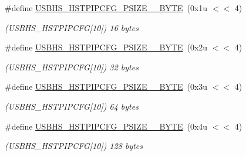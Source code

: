 \begin{DoxyCompactItemize}
\mbox{\label{group__SAMV71__USBHS_gad29ee9956753a47492c14355735f54e0}} 
\#define \mbox{\hyperlink{group__SAMV71__USBHS_gad29ee9956753a47492c14355735f54e0}{U\+S\+B\+H\+S\+\_\+\+H\+S\+T\+P\+I\+P\+C\+F\+G\+\_\+\+P\+S\+I\+Z\+E\+\_\+\_\+\+B\+Y\+TE}}~(0x1u $<$$<$ 4)
\begin{DoxyCompactList}\small\item\em (U\+S\+B\+H\+S\+\_\+\+H\+S\+T\+P\+I\+P\+C\+FG\mbox{[}10\mbox{]}) 16 bytes \end{DoxyCompactList}\item 
\mbox{\label{group__SAMV71__USBHS_ga1eb09cbf11f9301e13a44c5f3d6f9c28}} 
\#define \mbox{\hyperlink{group__SAMV71__USBHS_ga1eb09cbf11f9301e13a44c5f3d6f9c28}{U\+S\+B\+H\+S\+\_\+\+H\+S\+T\+P\+I\+P\+C\+F\+G\+\_\+\+P\+S\+I\+Z\+E\+\_\+\_\+\+B\+Y\+TE}}~(0x2u $<$$<$ 4)
\begin{DoxyCompactList}\small\item\em (U\+S\+B\+H\+S\+\_\+\+H\+S\+T\+P\+I\+P\+C\+FG\mbox{[}10\mbox{]}) 32 bytes \end{DoxyCompactList}\item 
\mbox{\label{group__SAMV71__USBHS_ga6e25221de729be34f34dcb8b0dfe357c}} 
\#define \mbox{\hyperlink{group__SAMV71__USBHS_ga6e25221de729be34f34dcb8b0dfe357c}{U\+S\+B\+H\+S\+\_\+\+H\+S\+T\+P\+I\+P\+C\+F\+G\+\_\+\+P\+S\+I\+Z\+E\+\_\+\_\+\+B\+Y\+TE}}~(0x3u $<$$<$ 4)
\begin{DoxyCompactList}\small\item\em (U\+S\+B\+H\+S\+\_\+\+H\+S\+T\+P\+I\+P\+C\+FG\mbox{[}10\mbox{]}) 64 bytes \end{DoxyCompactList}\item 
\mbox{\label{group__SAMV71__USBHS_ga22bdb34d8abfe49e2495f03d6eab0334}} 
\#define \mbox{\hyperlink{group__SAMV71__USBHS_ga22bdb34d8abfe49e2495f03d6eab0334}{U\+S\+B\+H\+S\+\_\+\+H\+S\+T\+P\+I\+P\+C\+F\+G\+\_\+\+P\+S\+I\+Z\+E\+\_\+\_\+\+B\+Y\+TE}}~(0x4u $<$$<$ 4)
\begin{DoxyCompactList}\small\item\em (U\+S\+B\+H\+S\+\_\+\+H\+S\+T\+P\+I\+P\+C\+FG\mbox{[}10\mbox{]}) 128 bytes \end{DoxyCompactList}\item 
\mbox{\label{group__SAMV71__USBHS_ga8609c494ead12f66b21c1efb095173c5}} 

\end{DoxyCompactItemize}
